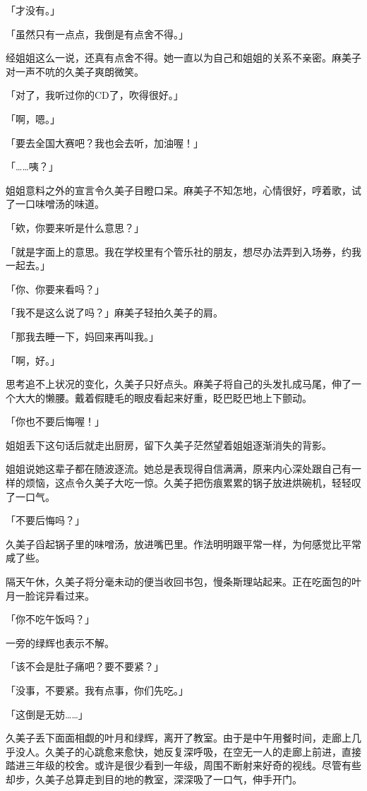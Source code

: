 \documentclass[UTF8]{ctexart}
\begin{document}
    「才没有。」 

    「虽然只有一点点，我倒是有点舍不得。」 

    经姐姐这么一说，还真有点舍不得。她一直以为自己和姐姐的关系不亲密。麻美子对一声不吭的久美子爽朗微笑。 

    「对了，我听过你的CD了，吹得很好。」 

    「啊，嗯。」 

    「要去全国大赛吧？我也会去听，加油喔！」 

    「……咦？」 

    姐姐意料之外的宣言令久美子目瞪口呆。麻美子不知怎地，心情很好，哼着歌，试了一口味噌汤的味道。 

    「欸，你要来听是什么意思？」 

    「就是字面上的意思。我在学校里有个管乐社的朋友，想尽办法弄到入场券，约我一起去。」 

    「你、你要来看吗？」 

    「我不是这么说了吗？」麻美子轻拍久美子的肩。 

    「那我去睡一下，妈回来再叫我。」 

    「啊，好。」 

    思考追不上状况的变化，久美子只好点头。麻美子将自己的头发扎成马尾，伸了一个大大的懒腰。戴着假睫毛的眼皮看起来好重，眨巴眨巴地上下颤动。 

    「你也不要后悔喔！」 

    姐姐丢下这句话后就走出厨房，留下久美子茫然望着姐姐逐渐消失的背影。 

    姐姐说她这辈子都在随波逐流。她总是表现得自信满满，原来内心深处跟自己有一样的烦恼，这点令久美子大吃一惊。久美子把伤痕累累的锅子放进烘碗机，轻轻叹了一口气。 

    「不要后悔吗？」 

    久美子舀起锅子里的味噌汤，放进嘴巴里。作法明明跟平常一样，为何感觉比平常咸了些。 

    隔天午休，久美子将分毫未动的便当收回书包，慢条斯理站起来。正在吃面包的叶月一脸诧异看过来。 

    「你不吃午饭吗？」 

    一旁的绿辉也表示不解。 

    「该不会是肚子痛吧？要不要紧？」 

    「没事，不要紧。我有点事，你们先吃。」 

    「这倒是无妨……」 

    久美子丢下面面相觑的叶月和绿辉，离开了教室。由于是中午用餐时间，走廊上几乎没人。久美子的心跳愈来愈快，她反复深呼吸，在空无一人的走廊上前进，直接踏进三年级的校舍。或许是很少看到一年级，周围不断射来好奇的视线。尽管有些却步，久美子总算走到目的地的教室，深深吸了一口气，伸手开门。 
\end{document}
